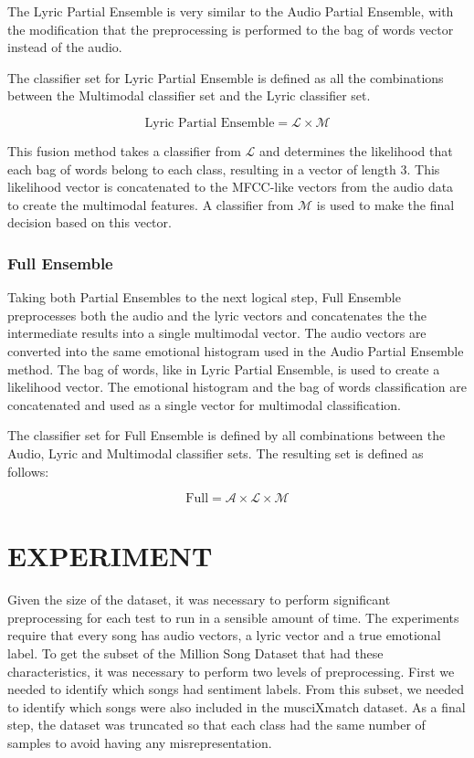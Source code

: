The Lyric Partial Ensemble is very similar to the Audio Partial Ensemble, with the modification that the preprocessing is  
performed to the bag of words vector instead of the audio. 

The classifier set for Lyric Partial Ensemble is defined as all the combinations between the Multimodal classifier set and the Lyric classifier set. 

\[ \text{Lyric Partial Ensemble} = \mathcal{L} \times \mathcal{M}   \]


This fusion method takes a classifier from $\mathcal{L}$ and determines the likelihood that each bag of words belong to each class, resulting
in a vector of length 3. This likelihood vector is concatenated to the MFCC-like vectors from the audio data to create the multimodal features. 
A classifier from $\mathcal{M}$ is used to make the final decision based on this vector. 

\subsection*{Full Ensemble}

Taking both Partial Ensembles to the next logical step, Full Ensemble preprocesses both the audio and the lyric vectors and concatenates the 
the intermediate results into a single multimodal vector. The audio vectors are converted into the same emotional histogram used in the Audio Partial
Ensemble method. The bag of words, like in Lyric Partial Ensemble, is used to create a likelihood vector. The emotional histogram and the bag of words classification are concatenated
and used as a single vector for multimodal classification.

The classifier set for Full Ensemble is defined by all combinations between the Audio, Lyric and Multimodal classifier sets. The resulting set is 
defined as follows:

\[ \text{Full} = \mathcal{A} \times  \mathcal{L} \times  \mathcal{M}\]


\chapter{EXPERIMENT}

Given the size of the dataset, it was necessary to perform significant preprocessing for each test to run in a sensible amount of time. The experiments require that every song has audio vectors, a lyric vector and a true emotional label. To get the subset of the Million Song Dataset that had these characteristics, it was necessary to perform two levels of preprocessing. First we needed to identify which songs had sentiment labels. From this subset, we needed to identify which songs were also included in the musciXmatch dataset. As a final step, the dataset was truncated so that each class had the same number of samples to avoid having any misrepresentation. 

